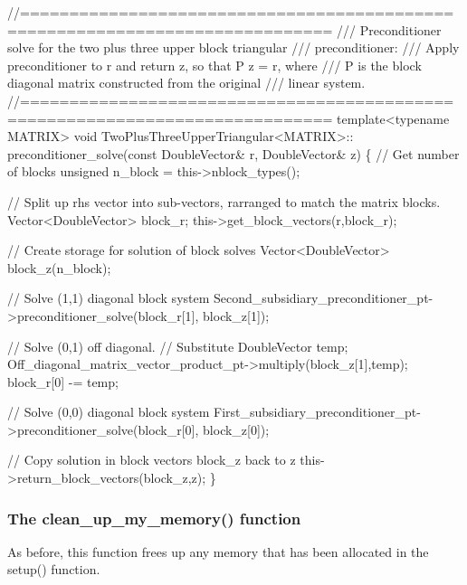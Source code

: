 \begin{DoxyCodeInclude}
 \textcolor{comment}{//=============================================================================}\textcolor{comment}{}
\textcolor{comment}{ /// Preconditioner solve for the two plus three upper block triangular }
\textcolor{comment}{ /// preconditioner: }
\textcolor{comment}{ /// Apply preconditioner to r and return z, so that P z = r, where}
\textcolor{comment}{ /// P is the block diagonal matrix constructed from the original }
\textcolor{comment}{ /// linear system.}
\textcolor{comment}{} \textcolor{comment}{//=============================================================================}
 \textcolor{keyword}{template}<\textcolor{keyword}{typename} MATRIX> 
 \textcolor{keywordtype}{void} TwoPlusThreeUpperTriangular<MATRIX>::
 preconditioner\_solve(\textcolor{keyword}{const} DoubleVector& r, DoubleVector& z)
 \{
  \textcolor{comment}{// Get number of blocks}
  \textcolor{keywordtype}{unsigned} n\_block = this->nblock\_types();

  \textcolor{comment}{// Split up rhs vector into sub-vectors, rarranged to match the matrix blocks.}
  Vector<DoubleVector> block\_r;
  this->get\_block\_vectors(r,block\_r);

  \textcolor{comment}{// Create storage for solution of block solves}
  Vector<DoubleVector> block\_z(n\_block);

  \textcolor{comment}{// Solve (1,1) diagonal block system}
  Second\_subsidiary\_preconditioner\_pt->preconditioner\_solve(block\_r[1],
                                                            block\_z[1]);

  \textcolor{comment}{// Solve (0,1) off diagonal.}
  \textcolor{comment}{// Substitute}
  DoubleVector temp;
  Off\_diagonal\_matrix\_vector\_product\_pt->multiply(block\_z[1],temp);
  block\_r[0] -= temp;   

  \textcolor{comment}{// Solve (0,0) diagonal block system}
  First\_subsidiary\_preconditioner\_pt->preconditioner\_solve(block\_r[0],
                                                           block\_z[0]); 

  \textcolor{comment}{// Copy solution in block vectors block\_z back to z}
  this->return\_block\_vectors(block\_z,z);
 \}

\end{DoxyCodeInclude}
\hypertarget{index_two_plus_three_upper_triangular_clean}{}\subsubsection{The clean\+\_\+up\+\_\+my\+\_\+memory() function}\label{index_two_plus_three_upper_triangular_clean}
As before, this function frees up any memory that has been allocated in the {\ttfamily setup()} function.


